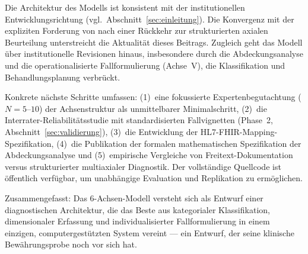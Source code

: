 \documentclass[11pt,a4paper]{article}
\begin{document}
Die Architektur des Modells ist konsistent mit der institutionellen Entwicklungsrichtung (vgl.\ Abschnitt~\ref{sec:einleitung}). Die Konvergenz mit der expliziten Forderung von \citet{ErlichFirst2025} nach einer R\"uckkehr zur strukturierten axialen Beurteilung unterstreicht die Aktualit\"at dieses Beitrags. Zugleich geht das Modell \"uber institutionelle Revisionen hinaus, insbesondere durch die Abdeckungsanalyse und die operationalisierte Fallformulierung (Achse~V), die Klassifikation und Behandlungsplanung verbr\"uckt.

Konkrete n\"achste Schritte umfassen: (1)~eine fokussierte Expertenbegutachtung ($N = 5$--$10$) der Achsenstruktur als unmittelbarer Minimalschritt, (2)~die Interrater-Reliabilit\"atsstudie mit standardisierten Fallvignetten (Phase~2, Abschnitt~\ref{sec:validierung}), (3)~die Entwicklung der HL7-FHIR-Mapping-Spezifikation, (4)~die Publikation der formalen mathematischen Spezifikation der Abdeckungsanalyse und (5)~empirische Vergleiche von Freitext-Dokumentation versus strukturierter multiaxialer Diagnostik. Der vollst\"andige Quellcode ist \"offentlich verf\"ugbar, um unabh\"angige Evaluation und Replikation zu erm\"oglichen.

Zusammengefasst: Das 6-Achsen-Modell versteht sich als Entwurf einer diagnostischen Architektur, die das Beste aus kategorialer Klassifikation, dimensionaler Erfassung und individualisierter Fallformulierung in einem einzigen, computergest\"utzten System vereint --- ein Entwurf, der seine klinische Bew\"ahrungsprobe noch vor sich hat.
\end{document}
